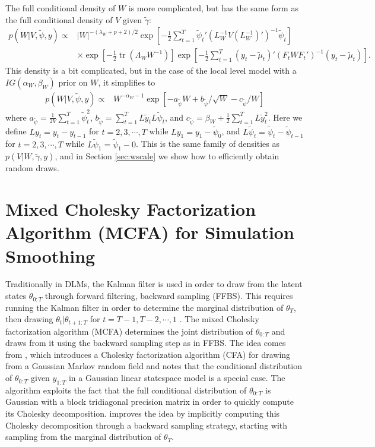 \documentclass{article}
\DeclareMathOperator{\tr}{tr}
\begin{document}
The full conditional density of $W$ is more complicated, but has the same form as the full conditional density of $V$ given $\tilde{\gamma}$:
\begin{align*}
  p(W|V,\tilde{\psi},y) \propto& |W|^{-(\lambda_W + p + 2)/2}\exp\left[-\frac{1}{2}\sum_{t=1}^T\tilde{\psi}_t'(L_W^{-1}V(L_W^{-1})')^{-1}\tilde{\psi}_t\right] \\
  & \times \exp\left[-\frac{1}{2}\tr\left(\Lambda_WW^{-1}\right)\right]\exp\left[-\frac{1}{2}\sum_{t=1}^T(y_t - \tilde{\mu}_t)'(F_tWF_t')^{-1}(y_t-\tilde{\mu}_t)\right].
\end{align*}
This density is a bit complicated, but in the case of the local level model with a $IG(\alpha_W,\beta_W)$ prior on $W$, it simplifies to
\begin{align*}
p(W|V,\tilde{\psi},y) \propto& W^{-\alpha_W-1}\exp\left[ -a_{\tilde{\psi}}W + b_{\tilde{\psi}}/\sqrt{W} -c_{\tilde{\psi}}/W\right]
\end{align*}
where $a_{\tilde{\psi}} = \frac{1}{2V}\sum_{t=1}^T\tilde{\psi}_t^2$,  $b_{\tilde{\psi}} = \sum_{t=1}^TL\tilde{y}_tL\tilde{\psi}_t$, and $c_{\tilde{\psi}} = \beta_W + \frac{1}{2}\sum_{t=1}^TL\tilde{y}_t^2$. Here we define $Ly_t = y_t - y_{t-1}$ for $t=2,3,\cdots,T$ while $Ly_1 = y_1 - \tilde{\psi}_0$, and $L\tilde{\psi}_t = \tilde{\psi}_t - \tilde{\psi}_{t-1}$ for $t=2,3,\cdots,T$ while $L\tilde{\psi}_1 = \tilde{\psi}_1 - 0$. This is the same family of densities as $p(V|W,\tilde{\gamma},y)$, and in Section \ref{sec:wscale} we show how to efficiently obtain random draws.

\section{Mixed Cholesky Factorization Algorithm (MCFA) for Simulation Smoothing}\label{sec:MCFA}

Traditionally in DLMs, the Kalman filter is used in order to draw from the latent states $\theta_{0:T}$ through forward filtering, backward sampling (FFBS). This requires running the Kalman filter in order to determine the marginal distribution of $\theta_T$, then drawing $\theta_t|\theta_{t+1:T}$ for $t=T-1,T-2,\cdots,1$ \cite{carter1994gibbs,fruhwirth1994data}. The mixed Cholesky factorization algorithm (MCFA) determines the joint distribution of $\theta_{0:T}$ and draws from it using the backward sampling step as in FFBS. The idea comes from , which introduces a Cholesky factorization algorithm (CFA) for drawing from a Gaussian Markov random field and notes that the conditional distribution of $\theta_{0:T}$ given $y_{1:T}$ in a Gaussian linear statespace model is a special case. The algorithm exploits the fact that the full conditional distribution of $\theta_{0:T}$ is Gaussian with a block tridiagonal precision matrix in order to quickly compute its Cholesky decomposition.  improves the idea by implicitly computing this Cholesky decomposition through a backward sampling strategy, starting with sampling from the marginal distribution of $\theta_T$. 
\end{document}
